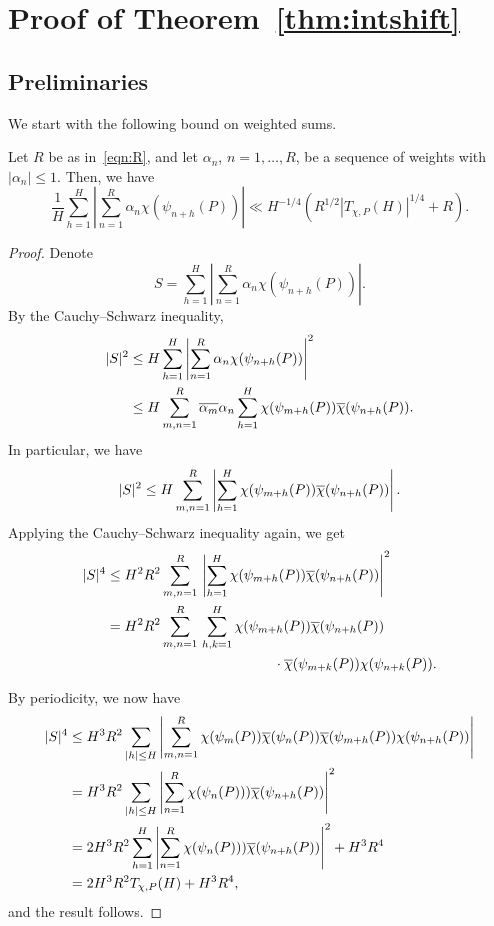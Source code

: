 \documentclass[12pt]{amsart}
\begin{document}
\section{Proof of Theorem~\ref{thm:intshift}} 
\subsection{Preliminaries} 
We start with the following bound on weighted sums. 

\begin{lem}\label{lem:twistby1bdd}
Let $R$ be as in~\eqref{eqn:R}, and let $\alpha_n$, $n=1, \ldots, R$, be a sequence of weights with $|\alpha_n| \le 1$.  Then, we have
\[
\frac{1}{H}\sum_{h=1}^H \left|  \sum_{n=1}^R \alpha_n\chi(\psi_{n+h}(P))\right|
\ll  H^{-1/4}\left(R^{1/2}\left|T_{\chi,P}(H)\right|^{1/4}+ R\right).
\]
\end{lem}

\begin{proof}
Denote 
$$S=\sum_{h=1}^H \left|\sum_{n=1}^R \alpha_n\chi(\psi_{n + h}(P)) \right|.$$
By the Cauchy--Schwarz inequality,
\begin{align*}
|S|^2&\leq H \sum_{h=1}^H \left|\sum_{n=1}^R \alpha_n\chi(\psi_{n + h}(P))\right|^2\\
&\leq H \sum_{m,n=1}^R \overline{\alpha_m} \alpha_n \sum_{h=1}^H\chi(\psi_{m +h}(P)) \overline{\chi}(\psi_{n + h}(P)).
\end{align*}
In particular, we have
$$|S|^2\leq H \sum_{m,n=1}^R \left|\sum_{h=1}^H\chi(\psi_{m  + h}(P)) \overline{\chi}(\psi_{n+ h}(P))\right|.$$
Applying the Cauchy--Schwarz inequality again, we get
\begin{align*}
 |S|^4&\leq H^2R^2 \sum_{m,n=1}^R\,\left|\sum_{h=1}^H \chi(\psi_{m+ h}(P)) \overline{\chi}(\psi_{n+ h}(P))\right|^2\\
 &= H^2R^2 \sum_{m,n=1}^R\,\sum_{h,k=1}^H \chi(\psi_{m + h}(P)) \overline{\chi}(\psi_{n + h}(P))\\ 
&\qquad\qquad\qquad\qquad\qquad\qquad \cdot \overline{\chi}(\psi_{m + k}(P)) \chi(\psi_{n+ k}(P)).
\end{align*}

By periodicity,  we now have 
\begin{align*}
 |S|^4&\leq H^3R^2     \sum_{|h| \leq H}  \left|
 \sum_{m,n=1}^R  \chi(\psi_{m}(P)) \overline{\chi}(\psi_{n}(P))  \overline{\chi}(\psi_{m + h}(P)) \chi(\psi_{n+ h}(P)) \right|\\
 &= H^3R^2     \sum_{|h| \leq H}  \left|
\sum_{n=1}^R  \chi(\psi_{n}(P))  ) \overline{\chi}(\psi_{n+ h}(P)) \right|^2\\
 & = 2 H^3R^2   \sum_{h=1}^H  \left|
 \sum_{n=1}^R \chi(\psi_{n}(P))  ) \overline{\chi}(\psi_{n+ h}(P)) \right|^2 + H^3R^4\\
 &=  2 H^3R^2 T_{\chi,P}(H)+ H^3R^4, 
\end{align*} 
and the result follows. 
\end{proof} 
 
\end{document}

